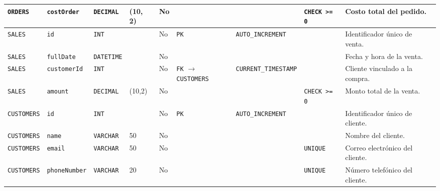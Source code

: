 \documentclass[11pt]{article}
\begin{document}
\begin{landscape}
\begin{xltabular}{\textheight}{
    | p{3.1cm} 
    | p{2.0cm} 
    | p{1.5cm} 
    | p{1.4cm} 
    | p{0.9cm} 
    | p{3.0cm} 
    | p{3.0cm} 
    | p{2.0cm} 
    | p{3.5cm} |
}
    \midrule
    \texttt{ORDERS}             & \texttt{costOrder}   & \texttt{DECIMAL}   & (10, 2)              & No   &                                                                &                             & \texttt{CHECK >= 0}    & Costo total del pedido. \\    
    \midrule
    \texttt{SALES}              & \texttt{id}          & \texttt{INT}       &                      & No   & \texttt{PK}                                                    & \texttt{AUTO\_INCREMENT}    &               & Identificador único de venta. \\
    \midrule
    \texttt{SALES}              & \texttt{fullDate}    & \texttt{DATETIME}  &                      & No   &                                                                &                             &               & Fecha y hora de la venta. \\
    \midrule
    \texttt{SALES}              & \texttt{customerId}  & \texttt{INT}       &                      & No   & \texttt{FK} $\longrightarrow$ \texttt{CUSTOMERS}                 & \texttt{CURRENT\_TIMESTAMP} &               & Cliente vinculado a la compra. \\
    \midrule
    \texttt{SALES}              & \texttt{amount}      & \texttt{DECIMAL}   & (10,2)               & No   &                                                                &                             & \texttt{CHECK >= 0}    & Monto total de la venta. \\      
    \midrule
    \texttt{CUSTOMERS}          & \texttt{id}          & \texttt{INT}       &                      & No   & \texttt{PK}                                                    & \texttt{AUTO\_INCREMENT}    &               & Identificador único de cliente. \\
    \midrule
    \texttt{CUSTOMERS}          & \texttt{name}        & \texttt{VARCHAR}   & 50                   & No   &                                                                &                             &               & Nombre del cliente. \\             
    \midrule
    \texttt{CUSTOMERS}          & \texttt{email}       & \texttt{VARCHAR}   & 50                   & No   &                                                                &                             & \texttt{UNIQUE}        & Correo electrónico del cliente. \\ 
    \midrule
    \texttt{CUSTOMERS}          & \texttt{phoneNumber} & \texttt{VARCHAR}   & 20                   & No   &                                                                &                             & \texttt{UNIQUE}        & Número telefónico del cliente. \\  

\end{xltabular}
\end{landscape}
\end{document}
